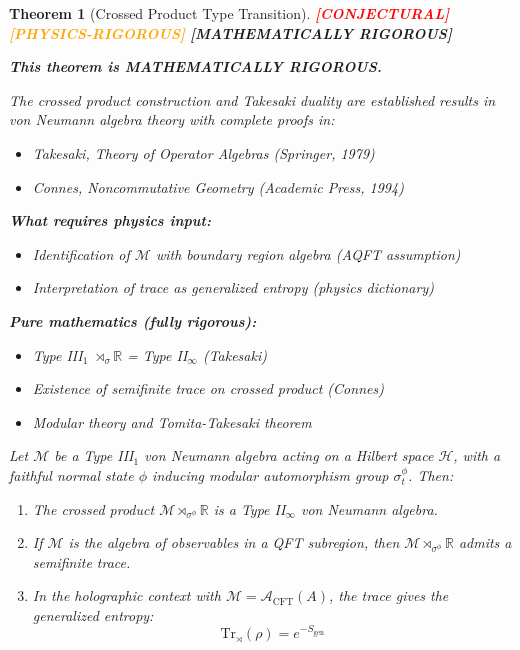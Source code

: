 \documentclass[12pt,a4paper]{article}
\newtheorem{theorem}{Theorem}[section]
\newcommand{\rigormark}[1]{%
  \ifcase#1
    \textcolor{red}{\textbf{[CONJECTURAL]}}%
  \or
    \textcolor{orange}{\textbf{[PHYSICS-RIGOROUS]}}%
  \or
    \textcolor{green!50!black}{\textbf{[MATHEMATICALLY RIGOROUS]}}%
  \fi
}
\begin{document}
\begin{theorem}[Crossed Product Type Transition]\label{thm:type-transition}
\rigormark{2} %

\begin{rigorbox}
\textbf{This theorem is MATHEMATICALLY RIGOROUS.}

The crossed product construction and Takesaki duality are established results in von Neumann algebra theory with complete proofs in:
\begin{itemize}
    \item Takesaki, \textit{Theory of Operator Algebras} (Springer, 1979)
    \item Connes, \textit{Noncommutative Geometry} (Academic Press, 1994)
\end{itemize}

\textbf{What requires physics input:}
\begin{itemize}
    \item Identification of $\mathcal{M}$ with boundary region algebra (AQFT assumption)
    \item Interpretation of trace as generalized entropy (physics dictionary)
\end{itemize}

\textbf{Pure mathematics (fully rigorous):}
\begin{itemize}
    \item Type III$_1$ $\rtimes_\sigma \mathbb{R}$ = Type II$_\infty$ (Takesaki)
    \item Existence of semifinite trace on crossed product (Connes)
    \item Modular theory and Tomita-Takesaki theorem
\end{itemize}
\end{rigorbox}

Let $\mathcal{M}$ be a Type III$_1$ von Neumann algebra acting on a Hilbert space $\mathcal{H}$, with a faithful normal state $\phi$ inducing modular automorphism group $\sigma_t^\phi$. Then:
\begin{enumerate}
    \item The crossed product $\mathcal{M} \rtimes_{\sigma^\phi} \mathbb{R}$ is a Type II$_\infty$ von Neumann algebra.
    \item If $\mathcal{M}$ is the algebra of observables in a QFT subregion, then $\mathcal{M} \rtimes_{\sigma^\phi} \mathbb{R}$ admits a semifinite trace.
    \item In the holographic context with $\mathcal{M} = \mathcal{A}_{\text{CFT}}(A)$, the trace gives the generalized entropy:
    \begin{equation}
    \text{Tr}_{\rtimes}(\rho) = e^{-S_{\text{gen}}}
    \end{equation}
\end{enumerate}
\end{theorem}
\end{document}
